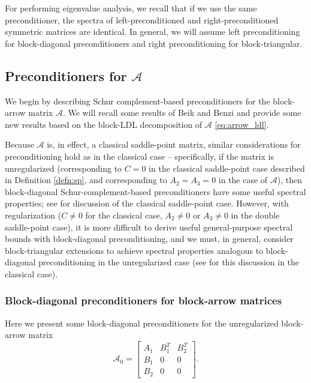 \documentclass{article}
\newcommand{\sA}{\mathcal{A}}
\begin{document}
For performing eigenvalue analysis, we recall that if we use the same preconditioner, the spectra of left-preconditioned and right-preconditioned symmetric matrices are identical. In general, we will assume left preconditioning for block-diagonal preconditioners and right preconditioning for block-triangular.

\subsection{Preconditioners for $\sA$}
We begin by describing Schur complement-based preconditioners for the block-arrow matrix $\sA$. We will recall some results of Beik and Benzi \cite{bb18} and provide some new results based on the block-LDL decomposition of $\sA$ \eqref{eq:arrow_ldl}.

Because $\sA$ is, in effect, a classical saddle-point matrix, similar considerations for preconditioning hold as in the classical case -- specifically, if the matrix is unregularized (corresponding to $C=0$ in the classical saddle-point case described in Definition \ref{defn:sp}, and corresponding to $A_2 = A_3 = 0$ in the case of $\sA$), then block-diagonal Schur-complement-based preconditioners have some useful spectral properties; see \cite{mgw00} for discussion of the classical saddle-point case. However, with regularization ($C\ne0$ for the classical case, $A_2 \ne 0$ or $A_3 \ne 0$ in the double saddle-point case), it is more difficult to derive useful general-purpose spectral bounds with block-diagonal preconditioning, and we must, in general, consider block-triangular extensions to achieve spectral properties analogous to block-diagonal preconditioning in the unregularized case (see \cite{i01} for this discussion in the classical case).

\subsubsection{Block-diagonal preconditioners for block-arrow matrices}
Here we present some block-diagonal preconditioners for the unregularized block-arrow matrix
\begin{equation}
    \sA_0 = \begin{bmatrix}
        A_1 & B_1^T & B_2^T \\
        B_1 & 0 & 0 \\
        B_2 & 0 & 0
    \end{bmatrix}. 
\end{equation}
\end{document}
